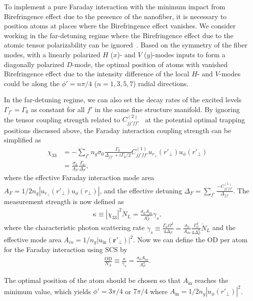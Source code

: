 \documentclass[preprint,aps,pra,onecolumn,superscriptaddress]{revtex4-1} %
\def\br{\mathbf{r}}
\begin{document}
To implement a pure Faraday interaction with the minimum impact from Birefringence effect due to the presence of the nanofiber, it is necessary to position atoms at places where the Birefringence effect vanishes. 
We consider working in the far-detuning regime where the Birefringence effect due to the atomic tensor polarizability can be ignored~\cite{Deutsch2010a}. 
Based on the symmetry of the fiber modes, with a linearly polarized $H$ ($x$)- and $V$ ($ y $)-modes inputs to form a diagonally polarized $ D $-mode, the optimal position of atoms with vanished Birefringence effect due to the intensity difference of the local $ H $- and $ V $-modes could be along the $ \phi'=n\pi/4 $ ($ n=1,3,5,7 $) radial directions. 

In the far-detuning regime, we can also set the decay rates of the excited levels $ \Gamma_{f'}= \Gamma_0$ as constant for all $ f' $ in the same fine structure manifold.
By ignoring the tensor coupling strength related to $ C_{jj'ff'}^{(2)} $~\cite{Deutsch2010a} at the potential optimal trapping positions discussed above, the Faraday interaction coupling strength can be simplified as
\begin{align}
\chi_{33} &= -\sum_{f'}n_g\sigma_0\frac{\Gamma_0}{\Delta_{ff'}+i\Gamma_0/2}C_{jj'ff'}^{(1)}u_{r\!_\perp}(r'\!_\perp)u_\phi(r'\!_\perp)\\
&=\frac{\sigma_0}{A_F}\frac{\Gamma_0}{\Delta_F},
\end{align}
where the effective Faraday interaction mode area $ A_F=1/2n_g|u_{r\!_\perp}(r'\!_\perp)u_\phi(r\!_\perp)| $, and the effective detuning $ \Delta_F=\sum_{f'}\frac{-C_{jj'ff'}^{(1)}}{\Delta_{ff'}} $.
The measurement strength is now defined as
\begin{align}
\kappa\equiv|\chi_{33}|^2\dot{N}_L=\frac{\sigma_0A_{in}}{A_F^2}\gamma_s,
\end{align}
where the characteristic photon scattering rate $ \gamma_s\equiv \frac{\Gamma_0\Omega^2}{4\Delta_F}=\frac{\sigma_0}{A_{in}}\frac{\Gamma_0^2}{4\Delta_F^2}\dot{N}_L $ and the effective mode area $ A_{in}=1/n_g|u_{\mathrm{in}}(\br'\!_\perp)|^2 $.
Now we can define the OD per atom for the Faraday interaction using SCS by
\begin{align}
\frac{\mathrm{OD}}{N_A} \equiv \frac{\kappa}{\gamma_s}=\frac{\sigma_0A_{in}}{A_F^2}.
\end{align}

The optimal position of the atom should be chosen so that $ A_{\mathrm{in}} $ reaches the minimum value, which yields $ \phi'=3\pi/4 $ or $ 7\pi/4 $ where $ A_{\mathrm{in}}=1/2n_g|u_\phi(r'\!_\perp)|^2 $.
\end{document}
